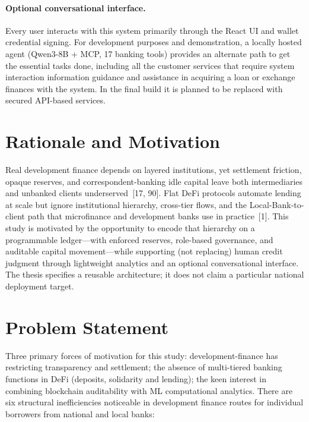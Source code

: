 \documentclass[12pt,a4paper]{report}
\begin{document}
\paragraph{Optional conversational interface.}
Every user interacts with this system primarily through the React UI and wallet credential signing. For development purposes and demonstration, a locally hosted agent (Qwen3-8B + MCP, 17 banking tools) provides an alternate path to get the essential tasks done, including all the customer services that require system interaction information guidance and assistance in acquiring a loan or exchange finances with the system. In the final build it is planned to be replaced with secured API-based services.

\section{Rationale and Motivation}
\label{sec:rationale}

Real development finance depends on layered institutions, yet settlement friction, opaque reserves, and correspondent-banking idle capital leave both intermediaries and unbanked clients underserved~[17, 90]. Flat DeFi protocols automate lending at scale but ignore institutional hierarchy, cross-tier flows, and the Local-Bank-to-client path that microfinance and development banks use in practice~[1]. This study is motivated by the opportunity to encode that hierarchy on a programmable ledger---with enforced reserves, role-based governance, and auditable capital movement---while supporting (not replacing) human credit judgment through lightweight analytics and an optional conversational interface. The thesis specifies a reusable architecture; it does not claim a particular national deployment target.

\section{Problem Statement}

Three primary forces of motivation for this study: development-finance has restricting transparency and settlement; the absence of multi-tiered banking functions in DeFi (deposits, solidarity and lending); the keen interest in combining blockchain auditability with ML computational analytics. There are six structural inefficiencies noticeable in development finance routes for individual borrowers from national and local banks:
\end{document}
